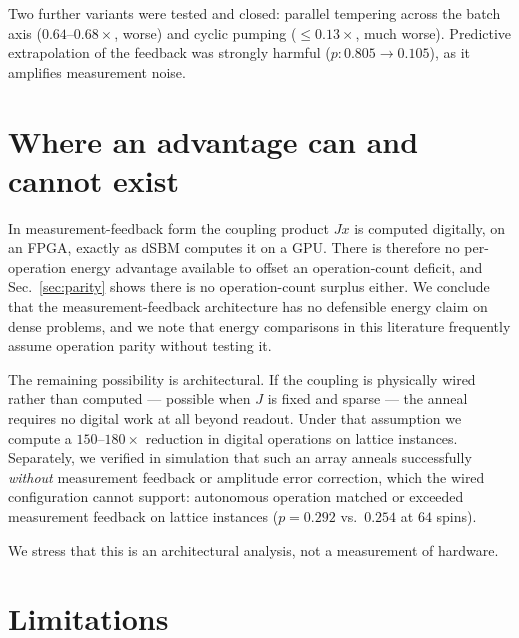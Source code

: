 \documentclass[11pt]{article}
\begin{document}
Two further variants were tested and closed: parallel tempering across the batch
axis ($0.64$--$0.68\times$, worse) and cyclic pumping ($\le0.13\times$, much
worse). Predictive extrapolation of the feedback was strongly harmful
($p:0.805\to0.105$), as it amplifies measurement noise.

\section{Where an advantage can and cannot exist}
\label{sec:where}

In measurement-feedback form the coupling product $Jx$ is computed digitally, on
an FPGA, exactly as dSBM computes it on a GPU. There is therefore no
per-operation energy advantage available to offset an operation-count deficit,
and Sec.~\ref{sec:parity} shows there is no operation-count surplus either. We
conclude that the measurement-feedback architecture has no defensible energy
claim on dense problems, and we note that energy comparisons in this literature
frequently assume operation parity without testing it.

The remaining possibility is architectural. If the coupling is physically wired
rather than computed --- possible when $J$ is fixed and sparse --- the anneal
requires no digital work at all beyond readout. Under that assumption we compute
a $150$--$180\times$ reduction in digital operations on lattice instances.
Separately, we verified in simulation that such an array anneals successfully
\emph{without} measurement feedback or amplitude error correction, which the
wired configuration cannot support: autonomous operation matched or exceeded
measurement feedback on lattice instances ($p=0.292$ vs.\ $0.254$ at $64$ spins).

We stress that this is an architectural analysis, not a measurement of hardware.

\section{Limitations}
\label{sec:limits}
\end{document}
